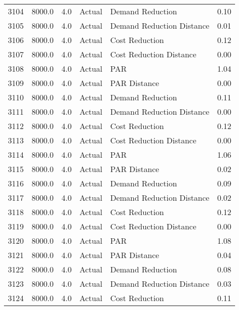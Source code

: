\begin{longtable}{lrrllr}
3104 &       8000.0 &     4.0 &         Actual &           Demand Reduction &   0.10 \\
3105 &       8000.0 &     4.0 &         Actual &  Demand Reduction Distance &   0.01 \\
3106 &       8000.0 &     4.0 &         Actual &             Cost Reduction &   0.12 \\
3107 &       8000.0 &     4.0 &         Actual &    Cost Reduction Distance &   0.00 \\
3108 &       8000.0 &     4.0 &         Actual &                        PAR &   1.04 \\
3109 &       8000.0 &     4.0 &         Actual &               PAR Distance &   0.00 \\
3110 &       8000.0 &     4.0 &         Actual &           Demand Reduction &   0.11 \\
3111 &       8000.0 &     4.0 &         Actual &  Demand Reduction Distance &   0.00 \\
3112 &       8000.0 &     4.0 &         Actual &             Cost Reduction &   0.12 \\
3113 &       8000.0 &     4.0 &         Actual &    Cost Reduction Distance &   0.00 \\
3114 &       8000.0 &     4.0 &         Actual &                        PAR &   1.06 \\
3115 &       8000.0 &     4.0 &         Actual &               PAR Distance &   0.02 \\
3116 &       8000.0 &     4.0 &         Actual &           Demand Reduction &   0.09 \\
3117 &       8000.0 &     4.0 &         Actual &  Demand Reduction Distance &   0.02 \\
3118 &       8000.0 &     4.0 &         Actual &             Cost Reduction &   0.12 \\
3119 &       8000.0 &     4.0 &         Actual &    Cost Reduction Distance &   0.00 \\
3120 &       8000.0 &     4.0 &         Actual &                        PAR &   1.08 \\
3121 &       8000.0 &     4.0 &         Actual &               PAR Distance &   0.04 \\
3122 &       8000.0 &     4.0 &         Actual &           Demand Reduction &   0.08 \\
3123 &       8000.0 &     4.0 &         Actual &  Demand Reduction Distance &   0.03 \\
3124 &       8000.0 &     4.0 &         Actual &             Cost Reduction &   0.11 \\

\end{longtable}
